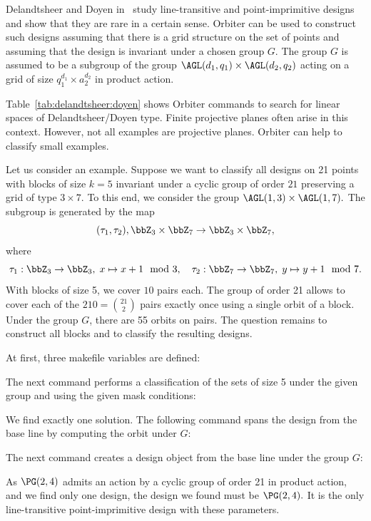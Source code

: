 

Delandtsheer and Doyen in~\cite{DelandtsheerDoyen1989} study 
line-transitive and point-imprimitive designs 
and show that they are rare in a certain sense.
Orbiter can be used to construct such designs 
assuming that there is a grid structure on the set 
of points and assuming that the design is invariant under a chosen group $G$. 
The group $G$ is assumed to be a subgroup of the group 
$\AGL(d_1,q_1) \times \AGL(d_2,q_2)$ acting on a grid of size 
$q_1^{d_1} \times a_2^{d_2}$ in product action.

\bigskip


Table~\ref{tab:delandtsheer:doyen} 
shows Orbiter commands to search for linear spaces of Delandtsheer/Doyen type.
Finite projective planes often arise in this context. 
However, not all examples are projective planes. 
Orbiter can help to classify small examples.

\bigskip

Let us consider an example. 
Suppose we want to classify all designs on 21 points with blocks of size $k=5$ 
invariant under a cyclic group of order $21$ preserving a grid of type $3 \times 7.$ 
To this end, we consider the group $\AGL(1,3) \times \AGL(1,7).$ 
The subgroup is generated by the map
$$
(\tau_1,\tau_2), \bbZ_3 \times \bbZ_7 \rightarrow  \bbZ_3 \times \bbZ_7,
$$ 
where 
$$
\tau_1: \bbZ_3 \rightarrow \bbZ_3, \; x \mapsto x+1 \mod 3,
\quad
\tau_2: \bbZ_7 \rightarrow \bbZ_7, \; y \mapsto y+1 \mod 7.
$$
With blocks of size 5, we cover $10$ pairs each. 
The group of order 21 allows to cover each of the $210={21\choose 2}$ pairs 
exactly once using a single orbit of a block.
Under the group $G$, there are 55 orbits on pairs.
The question remains to construct all blocks and to classify the resulting designs.

At first, three makefile variables are defined:







The next command performs a classification of the sets of size 5 under the given group and using the given mask conditions:


We find exactly one solution. The following command spans the design from the base line by computing the orbit under $G$:


The next command creates a design object from the base line under the group $G$:


As $\PG(2,4)$ admits an action by a cyclic group of order 21 in product action, 
and we find only one design, the design we found must be $\PG(2,4).$ 
It is the only line-transitive point-imprimitive design with these parameters.



